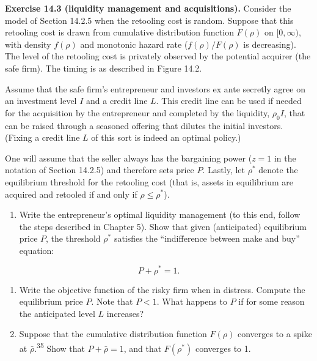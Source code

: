 \documentclass[11pt,a4paper]{article}
\providecommand{\tightlist}{\setlength{\itemsep}{0pt}\setlength{\parskip}{0pt}}
\begin{document}
\textbf{Exercise 14.3 (liquidity management and acquisitions).} Consider the model of Section 14.2.5
when the retooling cost is random. Suppose that this retooling cost is drawn from cumulative
distribution function \(F(\rho)\) on \([0, \infty)\), with density \(f(\rho)\) and monotonic hazard
rate (\(f(\rho)/F(\rho)\) is decreasing). The level of the retooling cost is privately observed by
the potential acquirer (the safe firm). The timing is as described in Figure 14.2.

Assume that the safe firm's entrepreneur and investors ex ante secretly agree on an investment level
\(I\) and a credit line \(L\). This credit line can be used if needed for the acquisition by the
entrepreneur and completed by the liquidity, \(\rho_0 I\), that can be raised through a seasoned
offering that dilutes the initial investors. (Fixing a credit line \(L\) of this sort is indeed an
optimal policy.)

One will assume that the seller always has the bargaining power (\(z = 1\) in the notation of
Section 14.2.5) and therefore sets price \(P\). Lastly, let \(\rho^*\) denote the equilibrium
threshold for the retooling cost (that is, assets in equilibrium are acquired and retooled if and
only if \(\rho \leqslant \rho^*\)).

\begin{enumerate}
\def\labelenumi{(\roman{enumi})}
\tightlist
\item
  Write the entrepreneur's optimal liquidity management (to this end, follow the steps described in
  Chapter 5). Show that given (anticipated) equilibrium price \(P\), the threshold \(\rho^*\)
  satisfies the ``indifference between make and buy'' equation:
\end{enumerate}

\[P + \rho^* = 1.\]

\begin{enumerate}
\def\labelenumi{(\roman{enumi})}
\setcounter{enumi}{1}
\item
  Write the objective function of the risky firm when in distress. Compute the equilibrium price
  \(P\). Note that \(P < 1\). What happens to \(P\) if for some reason the anticipated level \(L\)
  increases?
\item
  Suppose that the cumulative distribution function \(F(\rho)\) converges to a spike at
  \(\bar\rho\).\textsuperscript{35} Show that \(P + \bar\rho = 1\), and that \(F(\rho^*)\) converges
  to 1.
\end{enumerate}
\end{document}
